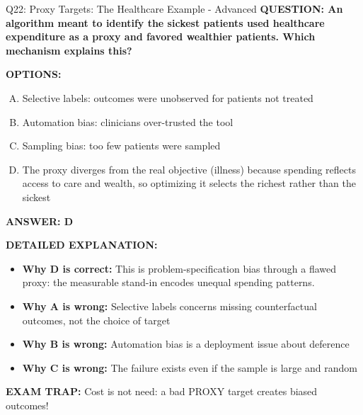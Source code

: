 \documentclass[8pt]{beamer}
\begin{document}
\begin{frame}[shrink=6]{Q22: Proxy Targets: The Healthcare Example - Advanced}
\fontsize{6.5}{7.5}\selectfont
\textbf{QUESTION: An algorithm meant to identify the sickest patients used healthcare expenditure as a proxy and favored wealthier patients. Which mechanism explains this?}

\vspace{0.1cm}
\textbf{OPTIONS:}
\begin{enumerate}[A.]
\item Selective labels: outcomes were unobserved for patients not treated
\item Automation bias: clinicians over-trusted the tool
\item Sampling bias: too few patients were sampled
\item The proxy diverges from the real objective (illness) because spending reflects access to care and wealth, so optimizing it selects the richest rather than the sickest
\end{enumerate}

\vspace{0.1cm}
\textcolor{myblue}{\textbf{ANSWER: D}}

\vspace{0.1cm}
\textbf{DETAILED EXPLANATION:}
\begin{itemize}
\item \textbf{Why D is correct:} This is problem-specification bias through a flawed proxy: the measurable stand-in encodes unequal spending patterns.
\item \textbf{Why A is wrong:} Selective labels concerns missing counterfactual outcomes, not the choice of target
\item \textbf{Why B is wrong:} Automation bias is a deployment issue about deference
\item \textbf{Why C is wrong:} The failure exists even if the sample is large and random
\end{itemize}

\textcolor{myred}{\textbf{EXAM TRAP:}} Cost is not need: a bad PROXY target creates biased outcomes!
\end{frame}
\end{document}
